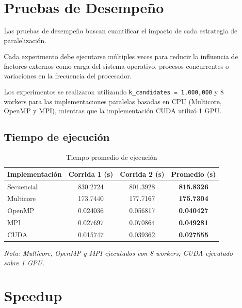 \section{Pruebas de Desempeño}

Las pruebas de desempeño buscan cuantificar el impacto de cada estrategia de paralelización.

Cada experimento debe ejecutarse múltiples veces para reducir la influencia de factores externos como carga del sistema operativo, procesos concurrentes o variaciones en la frecuencia del procesador.

Los experimentos se realizaron utilizando \texttt{k\_candidates = 1{,}000{,}000} y 8 workers para las implementaciones paralelas basadas en CPU (Multicore, OpenMP y MPI), mientras que la implementación CUDA utilizó 1 GPU.

\subsection{Tiempo de ejecución}

\begin{table}[H]
\centering
\caption{Tiempo promedio de ejecución}
\begin{tabular}{lccc}
\toprule
Implementación & Corrida 1 (s) & Corrida 2 (s) & Promedio (s) \\
\midrule
Secuencial & 830.2724 & 801.3928 & \textbf{815.8326} \\
Multicore  & 173.7440 & 177.7167 & \textbf{175.7304} \\
OpenMP     & 0.024036 & 0.056817 & \textbf{0.040427} \\
MPI        & 0.027697 & 0.070864 & \textbf{0.049281} \\
CUDA       & 0.015747 & 0.039362 & \textbf{0.027555} \\
\bottomrule
\end{tabular}
\end{table}

\textit{Nota: Multicore, OpenMP y MPI ejecutados con 8 workers; CUDA ejecutado sobre 1 GPU.}

\section{Speedup}

